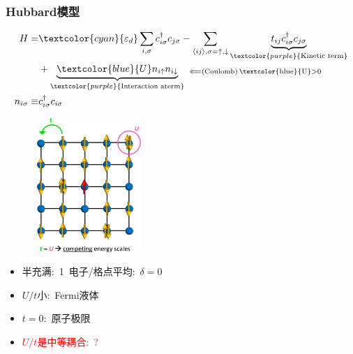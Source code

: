 {\frame
{
	\frametitle{\textrm{Hubbard}模型}
\begin{minipage}[b]{0.58\linewidth}
	\begin{displaymath}
		\begin{aligned}
			H=&\textcolor{cyan}{\varepsilon_d}\sum_{i,\sigma}c_{i\sigma}^{\dag}c_{j\sigma}-\sum_{\langle ij\rangle,\sigma=\uparrow,\downarrow}\underbrace{t_{ij}c_{i\sigma}^{\dag}c_{j\sigma}}_{\fontsize{6.2pt}{4.2pt}\selectfont{\textcolor{purple}{\mathrm{Kinetic~term}}}}\\
			&+\underbrace{\textcolor{blue}{U}n_{i\uparrow}n_{i\downarrow}}_{\fontsize{6.2pt}{4.2pt}\selectfont{\textcolor{purple}{\mathrm{Interaction~aterm}}}}~_{\fontsize{3.2pt}{2.2pt}\selectfont{\Longleftarrow\mathrm{(Coulomb)~\textcolor{blue}{U}>0}}} \\
			n_{i\sigma}\equiv&c_{i\sigma}^{\dag}c_{i\sigma}\\
		\end{aligned}
	\end{displaymath}
			{\fontsize{7.2pt}{5.2pt}}
\end{minipage}
\hfill
\begin{minipage}[t]{0.40\linewidth}
\begin{figure}[h!]
\centering
\vspace{-120pt}
\includegraphics[height=2.0in,width=1.65in,viewport=0 0 600 750,clip]{Figures/Hubbard_U-t.png}
\label{Hubbard-U}
\end{figure}
\end{minipage}
\vspace*{-25pt}
\begin{itemize}
	\item 半充满:~1~电子/格点平均:~$\delta=0$
	\item $U/t$小:~\textrm{Fermi}液体
	\item $t=0$:~原子极限
	\item \textcolor{red}{$U/t$是中等耦合:~?}
\end{itemize}
}

}
